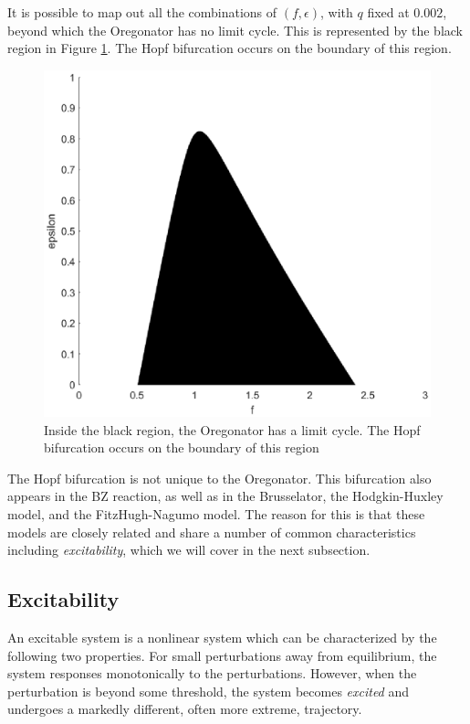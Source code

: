 \documentclass[twocolumn,amsmath,amssymb,aps]{revtex4}
\begin{document}
It is possible to map out all the combinations of $(f,\epsilon)$, with $q$ fixed at $0.002$, beyond which the Oregonator has no limit cycle. This is represented by the black region in Figure \ref{fig:Hopf}. The Hopf bifurcation occurs on the boundary of this region. 
\begin{figure}[!htb]
	\centering
	\includegraphics[scale=0.5]{bifurcation_new.eps}
	\caption{Inside the black region, the Oregonator has a limit cycle. The Hopf bifurcation occurs on the boundary of this region }
	\label{fig:Hopf}
\end{figure}




The Hopf bifurcation is not unique to the Oregonator. This bifurcation also appears in the BZ reaction, as well as in the Brusselator, the Hodgkin-Huxley model, and the FitzHugh-Nagumo model. The reason for this is that these models are closely related and share a number of common characteristics including \textit{excitability}, which we will cover in the next subsection.


\subsection{Excitability}
An excitable system is a nonlinear system which can be characterized by the following two properties. For small perturbations away from equilibrium, the system responses monotonically to the perturbations.  However, when the perturbation is beyond some threshold, the system becomes \textit{excited} and undergoes a markedly different, often more extreme, trajectory.  
\end{document}
